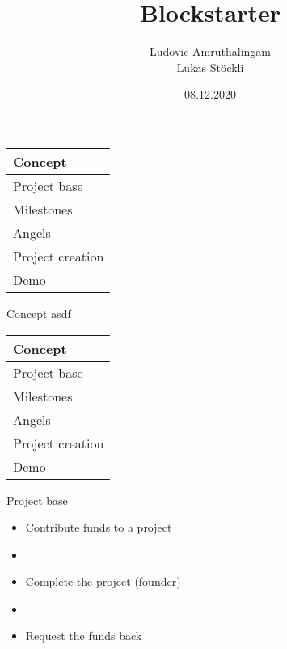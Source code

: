 \documentclass{beamer}
\title              {Blockstarter}
\author             {Ludovic Amruthalingam\\Lukas Stöckli}
\institute          {University of Basel}
\date               {08.12.2020}
\begin{document}
\begin{frame}[t,plain]
	\titlepage
\end{frame}




\begin{frame}
	\begin{tabularx}{\textwidth}{X}
		\hline
		\rowcolor{hcolor}
		Concept\\
		\hline
		Project base\\
		\hline
		Milestones\\
		\hline
		Angels\\
		\hline
		Project creation\\
		\hline
		Demo\\
		\hline
	\end{tabularx}
\end{frame}




\begin{frame}{Concept}
asdf
\end{frame}


\begin{frame}
	\begin{tabularx}{\textwidth}{X}
		\hline
		Concept\\
		\hline
		\rowcolor{hcolor}
		Project base\\
		\hline
		Milestones\\
		\hline
		Angels\\
		\hline
		Project creation\\
		\hline
		Demo\\
		\hline
	\end{tabularx}
\end{frame}


\begin{frame}{Project base}
\begin{itemize}
	\item Contribute funds to a project
	\item[]
	\item Complete the project (founder)
	\item[]
	\item Request the funds back
\end{itemize}
\end{frame}
\end{document}
